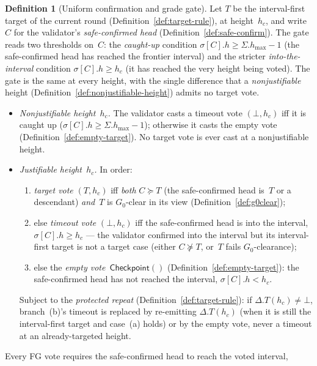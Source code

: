 \ifx\litemode\undefined\documentclass{article}\fi
\newcommand{\hmax}{\ensuremath{h_{\max}}\xspace}
\newcommand{\Gzero}{\ensuremath{G_{0}}}
\newcommand{\emptyckpt}{\ensuremath{\mathsf{Checkpoint}()}} %
\theoremstyle{plain}
\theoremstyle{definition}
\newtheorem{definition}{Definition}
\theoremstyle{remark}
\begin{document}
\begin{definition}[Uniform confirmation and grade gate]\label{def:conf-gate}
Let $T$ be the interval-first target of the current round
(Definition~\ref{def:target-rule}), at height~$h_c$, and write~$C$ for the
validator's \emph{safe-confirmed head} (Definition~\ref{def:safe-confirm}).
The gate reads two thresholds on~$C$: the \emph{caught-up} condition
$\sigma[C].h \geq \Sigma.\hmax - 1$ (the safe-confirmed head has reached the
frontier interval) and the stricter \emph{into-the-interval} condition
$\sigma[C].h \geq h_c$ (it has reached the very height being voted).  The gate
is the same at every height, with the single difference that a
\emph{nonjustifiable} height (Definition~\ref{def:nonjustifiable-height})
admits no target vote.
\begin{itemize}
  \item \emph{Nonjustifiable height~$h_c$.}  The validator casts a timeout vote
    $(\bot, h_c)$ iff it is caught up ($\sigma[C].h \geq \Sigma.\hmax - 1$);
    otherwise it casts the empty vote (Definition~\ref{def:empty-target}).  No
    target vote is ever cast at a nonjustifiable height.
  \item \emph{Justifiable height~$h_c$.}  In order:
    \begin{enumerate}[label=(\alph*)]
      \item \emph{target vote} $(T, h_c)$ iff \emph{both} $C \succeq T$
        (the safe-confirmed head is~$T$ or a descendant) \emph{and}~$T$ is
        $\Gzero$-clear in its view (Definition~\ref{def:g0clear});
      \item else \emph{timeout vote} $(\bot, h_c)$ iff the safe-confirmed head
        is into the interval, $\sigma[C].h \geq h_c$ --- the validator confirmed
        into the interval but its interval-first target is not a target case
        (either $C \nsucceq T$, or~$T$ fails $\Gzero$-clearance);
      \item else the \emph{empty vote}~$\emptyckpt$
        (Definition~\ref{def:empty-target}): the safe-confirmed head has not
        reached the interval, $\sigma[C].h < h_c$.
    \end{enumerate}
    Subject to the \emph{protected repeat} (Definition~\ref{def:target-rule}):
    if $\Delta.T(h_c) \neq \bot$, branch~(b)'s timeout is replaced by
    re-emitting $\Delta.T(h_c)$ (when it is still the interval-first target and
    case~(a) holds) or by the empty vote, never a timeout at an
    already-targeted height.
\end{itemize}
Every FG vote requires the safe-confirmed head to reach the voted interval,

\end{definition}
\end{document}
